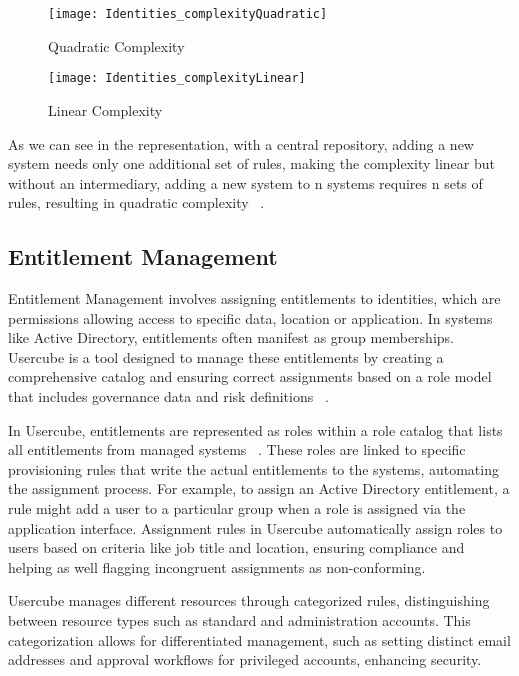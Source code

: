 \begin{figure}[htbp]
  \centering
  \begin{minipage}{0.48\textwidth}
    \texttt{[image: Identities\_complexityQuadratic]}
    \caption{Quadratic Complexity}
    \label{fig:Identities_complexityQuadratic}
  \end{minipage}\hfill
  \begin{minipage}{0.48\textwidth}
    \texttt{[image: Identities\_complexityLinear]}
    \caption{Linear Complexity}
    \label{fig:Identities_complexityLinear}
  \end{minipage}
\end{figure}

As we can see in the representation, with a central repository, adding a new system needs only one additional set of rules, making the complexity linear but without an intermediary, adding a new system to n systems requires n sets of rules, resulting in quadratic complexity ~\cite{UsercubeDocument}.

\subsection{Entitlement Management}

Entitlement Management involves assigning entitlements to identities, which are permissions allowing access to specific data, location or application. In systems like Active Directory, entitlements often manifest as group memberships. Usercube is a tool designed to manage these entitlements by creating a comprehensive catalog and ensuring correct assignments based on a role model that includes governance data and risk definitions ~\cite{UsercubeDocument}.

In Usercube, entitlements are represented as roles within a role catalog that lists all entitlements from managed systems ~\cite{UsercubeDocument}. These roles are linked to specific provisioning rules that write the actual entitlements to the systems, automating the assignment process. For example, to assign an Active Directory entitlement, a rule might add a user to a particular group when a role is assigned via the application interface. Assignment rules in Usercube automatically assign roles to users based on criteria like job title and location, ensuring compliance and helping as well flagging incongruent assignments as non-conforming.

Usercube manages different resources through categorized rules, distinguishing between resource types such as standard and administration accounts. This categorization allows for differentiated management, such as setting distinct email addresses and approval workflows for privileged accounts, enhancing security.

